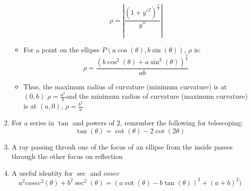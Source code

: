\documentclass{article}
\numberwithin{equation}{section}
\numberwithin{figure}{section}
\newcommand{\Det}[1]{\left|#1\right|}
\newcommand{\cosec}{cosec}
\begin{document}
\begin{enumerate}
\begin{itemize}
\begin{equation}
						\rho = \Det{\frac{(1+y'^2)^\frac{3}{2}}{y''}}
					\end{equation}
				\item For a point on the ellipse $P(a\cos(\theta), b\sin(\theta))$, $\rho$ is:
					\begin{equation}	
						\rho = \frac{(b \cos^2(\theta)+ a \sin^2(\theta))^\frac{3}{2}}{ab}		
					\end{equation}
				\item Thus, the maximum radius of curvature (minimum curvature) is at $(0,b)$ $\rho=\frac{a^2}{b}$and the minimum radius of curvature (maximum curvature) is at $(a,0)$, $\rho=\frac{b^2}{a}$

			\end{itemize}
   	\item For a series in $\tan$ and powers of $2$, remember the following for telescoping:
			\begin{equation}
				\tan(\theta)=\cot(\theta) - 2\cot(2\theta)
			\end{equation}
	\item A ray passing throuh one of the focus of an ellipse from the inside passes through the other focus on reflection
	\item A useful identity for $\sec$ and $\cosec$
		\begin{equation}
			a^2\cosec^2(\theta)+b^2\sec^2(\theta)=(a\cot(\theta)-b\tan(\theta))^2+(a+b)^2)
		\end{equation}
\end{enumerate}
\end{document}
